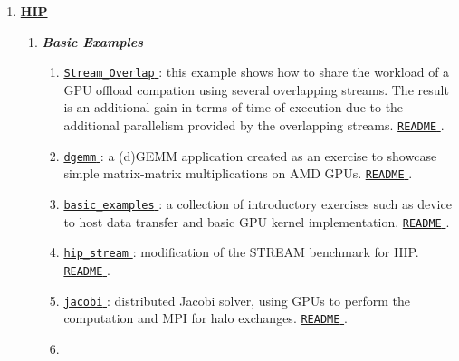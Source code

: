 \documentclass[
]{article}
\providecommand{\tightlist}{%
  \setlength{\itemsep}{0pt}\setlength{\parskip}{0pt}}
\let\oldtexttt\texttt
\renewcommand{\texttt}[1]{
  \colorbox{Light}{\oldtexttt{#1}}
}
\providecommand{\tightlist}{%
  \setlength{\itemsep}{0pt}\setlength{\parskip}{0pt}}
\begin{document}
\begin{enumerate}
\def\labelenumi{\arabic{enumi}.}
\tightlist
\item
  \href{https://github.com/amd/HPCTrainingExamples/tree/main/HIP}{\textbf{HIP}}

  \begin{enumerate}
  \def\labelenumii{\arabic{enumii}.}
  \tightlist
  \item
    \textbf{\emph{Basic Examples}}

    \begin{enumerate}
    \def\labelenumiii{\arabic{enumiii}.}
    \tightlist
    \item
      \href{https://github.com/amd/HPCTrainingExamples/tree/main/HIP/Stream_Overlap}{\texttt{Stream\_Overlap}}:
      this example shows how to share the workload of a GPU offload
      compation using several overlapping streams. The result is an
      additional gain in terms of time of execution due to the
      additional parallelism provided by the overlapping streams.
      \href{https://github.com/amd/HPCTrainingExamples/blob/main/HIP/Stream_Overlap/README.md}{\texttt{README}}.
    \item
      \href{https://github.com/amd/HPCTrainingExamples/tree/main/HIP/dgemm}{\texttt{dgemm}}:
      a (d)GEMM application created as an exercise to showcase simple
      matrix-matrix multiplications on AMD GPUs.
      \href{https://github.com/amd/HPCTrainingExamples/tree/main/HIP/dgemm/README.md}{\texttt{README}}.
    \item
      \href{https://github.com/amd/HPCTrainingExamples/tree/main/HIP/basic_examples}{\texttt{basic\_examples}}:
      a collection of introductory exercises such as device to host data
      transfer and basic GPU kernel implementation.
      \href{https://github.com/amd/HPCTrainingExamples/tree/main/HIP/exercises/README.md}{\texttt{README}}.
    \item
      \href{https://github.com/amd/HPCTrainingExamples/tree/main/HIP/hip-stream}{\texttt{hip\_stream}}:
      modification of the STREAM benchmark for HIP.
      \href{https://github.com/amd/HPCTrainingExamples/blob/main/HIP/hip-stream/README.md}{\texttt{README}}.
    \item
      \href{https://github.com/amd/HPCTrainingExamples/tree/main/HIP/jacobi}{\texttt{jacobi}}:
      distributed Jacobi solver, using GPUs to perform the computation
      and MPI for halo exchanges.
      \href{https://github.com/amd/HPCTrainingExamples/blob/main/HIP/jacobi/README.md}{\texttt{README}}.
    \item

\end{enumerate}
\end{enumerate}
\end{enumerate}
\end{document}
